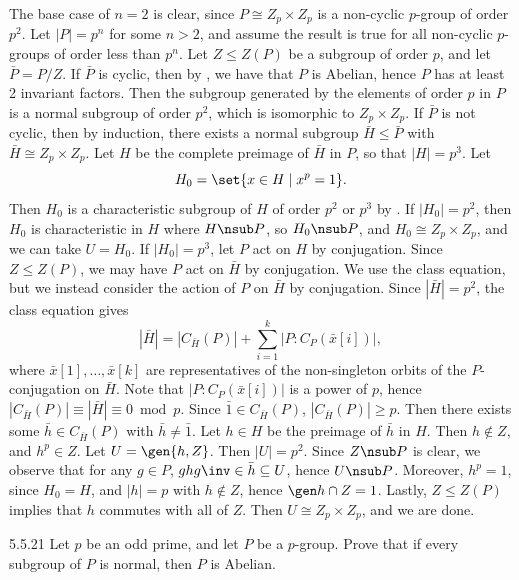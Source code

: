 \begin{sol}
    The base case of $n = 2$ is clear, since $P \cong Z_p \times Z_p$ is a non-cyclic $p$-group of order $p^2$.
	Let $|P| = p^n$ for some $n > 2$, and assume the result is true for all non-cyclic $p$-groups of order less than $p^n$.
	Let $Z \leq Z(P)$ be a subgroup of order $p$, and let $\bar P = P/Z$.
	If $\bar P$ is cyclic, then by , we have that $P$ is Abelian, hence $P$ has at least 2 invariant factors.
	Then the subgroup generated by the elements of order $p$ in $P$ is a normal subgroup of order $p^2$, which is isomorphic to $Z_p \times Z_p$.
	If $\bar P$ is not cyclic, then by induction, there exists a normal subgroup $\bar H \leq \bar P$ with $\bar H \cong Z_p \times Z_p$.
	Let $H$ be the complete preimage of $\bar H$ in $P$, so that $|H| = p^3$.
	Let
    \[
    	H_0 = \set{x \in H \mid x^p = 1}.
    \]
    Then $H_0$ is a characteristic subgroup of $H$ of order $p^2$ or $p^3$ by .
	If $|H_0| = p^2$, then $H_0$ is characteristic in $H$ where $H \nsub P$, so $H_0 \nsub P$, and $H_0 \cong Z_p \times Z_p$, and we can take $U = H_0$.
	If $|H_0| = p^3$, let $P$ act on $H$ by conjugation.
	Since $Z \leq Z(P)$, we may have $P$ act on $\bar H$ by conjugation.
	We use the class equation, but we instead consider the action of $P$ on $\bar H$ by conjugation.
	Since $|\bar H| = p^2$, the class equation gives
    \[
    	|\bar H| = |C_{\bar H}(P)| + \sum_{i = 1}^k |P : C_P(\bar x[i])|,
    \]
    where $\bar x[1], \ldots, \bar x[k]$ are representatives of the non-singleton orbits of the $P$-conjugation on $\bar H$.
	Note that $|P : C_P(\bar x[i])|$ is a power of $p$, hence $|C_{\bar H}(P)| \equiv |\bar H| \equiv 0 \bmod p$.
	Since $\bar 1 \in C_{\bar H}(P)$, $|C_{\bar H}(P)| \geq p$.
	Then there exists some $\bar h \in C_{\bar H}(P)$ with $\bar h \neq \bar 1$.
	Let $h \in H$ be the preimage of $\bar h$ in $H$.
	Then $h \notin Z$, and $h^p \in Z$.
	Let $U = \gen{h, Z}$.
	Then $|U| = p^2$.
	Since $Z \nsub P$ is clear, we observe that for any $g \in P$, $ghg\inv \in \bar h \subseteq U$, hence $U \nsub P$.
	Moreover, $h^p = 1$, since $H_0 = H$, and $|h| = p$ with $h \notin Z$, hence $\gen h \cap Z = 1$.
	Lastly, $Z \leq Z(P)$ implies that $h$ commutes with all of $Z$.
	Then $U \cong Z_p \times Z_p$, and we are done.
\end{sol}

\begin{spex}{5.5.21}
    Let $p$ be an odd prime, and let $P$ be a $p$-group.
	Prove that if every subgroup of $P$ is normal, then $P$ is Abelian.
    
    
\end{spex}

